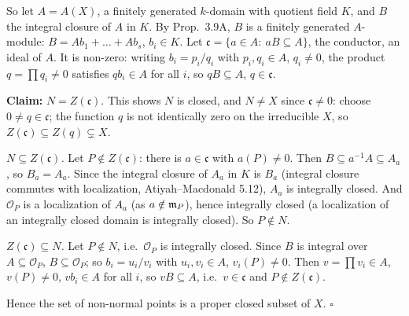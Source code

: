\documentclass[11pt]{article}
\begin{document}
So let $A=A(X)$, a finitely generated $k$-domain with quotient field $K$, and $B$ the integral closure of $A$ in $K$. By Prop.~3.9A, $B$ is a finitely generated $A$-module: $B=Ab_1+\dots+Ab_s$, $b_i\in K$. Let $\mathfrak c=\{a\in A:\ aB\subseteq A\}$, the conductor, an ideal of $A$. It is non-zero: writing $b_i=p_i/q_i$ with $p_i,q_i\in A$, $q_i\ne0$, the product $q=\prod q_i\neq0$ satisfies $qb_i\in A$ for all $i$, so $qB\subseteq A$, $q\in\mathfrak c$.

\textbf{Claim:} $N=Z(\mathfrak c)$. This shows $N$ is closed, and $N\ne X$ since $\mathfrak c\ne0$: choose $0\ne q\in \mathfrak c$; the function $q$ is not identically zero on the irreducible $X$, so $Z(\mathfrak c)\subseteq Z(q)\subsetneq X$.

\emph{$N\subseteq Z(\mathfrak c)$.} Let $P\notin Z(\mathfrak c)$: there is $a\in\mathfrak c$ with $a(P)\ne0$. Then $B\subseteq a^{-1}A\subseteq A_a$, so $B_a=A_a$. Since the integral closure of $A_a$ in $K$ is $B_a$ (integral closure commutes with localization, Atiyah--Macdonald 5.12), $A_a$ is integrally closed. And $\mathcal O_P$ is a localization of $A_a$ (as $a\notin\mathfrak m_P$), hence integrally closed (a localization of an integrally closed domain is integrally closed). So $P\notin N$.

\emph{$Z(\mathfrak c)\subseteq N$.} Let $P\notin N$, i.e.\ $\mathcal O_P$ is integrally closed. Since $B$ is integral over $A\subseteq\mathcal O_P$, $B\subseteq\mathcal O_P$; so $b_i=u_i/v_i$ with $u_i,v_i\in A$, $v_i(P)\ne0$. Then $v=\prod v_i\in A$, $v(P)\neq 0$, $vb_i\in A$ for all $i$, so $vB\subseteq A$, i.e.\ $v\in\mathfrak c$ and $P\notin Z(\mathfrak c)$.

Hence the set of non-normal points is a proper closed subset of $X$. \hfill$\square$
\end{document}

